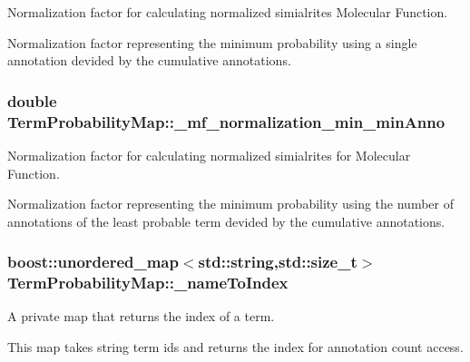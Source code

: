 Normalization factor for calculating normalized simialrites Molecular Function. 

Normalization factor representing the minimum probability using a single annotation devided by the cumulative annotations. 
\subsubsection[{\texorpdfstring{\+\_\+mf\+\_\+normalization\+\_\+min\+\_\+min\+Anno}{_mf_normalization_min_minAnno}}]{\setlength{\rightskip}{0pt plus 5cm}double Term\+Probability\+Map\+::\+\_\+mf\+\_\+normalization\+\_\+min\+\_\+min\+Anno\hspace{0.3cm}{\ttfamily [protected]}}\hypertarget{classTermProbabilityMap_adfbe0bba2e300c32941c7d83f8e3febb}{}\label{classTermProbabilityMap_adfbe0bba2e300c32941c7d83f8e3febb}


Normalization factor for calculating normalized simialrites for Molecular Function. 

Normalization factor representing the minimum probability using the number of annotations of the least probable term devided by the cumulative annotations. 
\subsubsection[{\texorpdfstring{\+\_\+name\+To\+Index}{_nameToIndex}}]{\setlength{\rightskip}{0pt plus 5cm}boost\+::unordered\+\_\+map$<$std\+::string,std\+::size\+\_\+t$>$ Term\+Probability\+Map\+::\+\_\+name\+To\+Index\hspace{0.3cm}{\ttfamily [protected]}}\hypertarget{classTermProbabilityMap_af94f810eb87afe5c7bddb14d19735e86}{}\label{classTermProbabilityMap_af94f810eb87afe5c7bddb14d19735e86}


A private map that returns the index of a term. 

This map takes string term ids and returns the index for annotation count access. 
